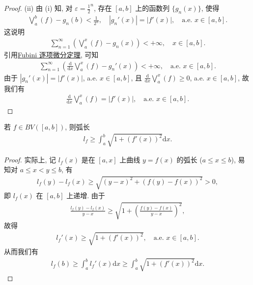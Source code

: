 \documentclass[../../main.tex]{subfiles}%
\begin{document}
\begin{proof}
(ii) 由 (i) 知, 对 $\varepsilon=\frac{1}{2}^n$, 存在 $[a,b]$ 上的函数列 $\{g_n(x)\}$, 使得
\begin{align*}
\bigvee_a^b(f) - g_n(b) < \frac{1}{2^n}, \quad |g_n'(x)| = |f'(x)|, \quad \text{a.e. } x\in[a,b].
\end{align*}
这说明
\begin{align*}
\sum_{n=1}^\infty \left(\bigvee_a^x(f) - g_n(x)\right) < +\infty, \quad x\in[a,b].
\end{align*}
引用\hyperref[theorem:实变函数--Fubini 逐项微分定理]{Fubini 逐项微分定理}, 可知
\begin{align*}
\sum_{n=1}^\infty \left(\frac{\mathrm{d}}{\mathrm{d}x}\bigvee_a^x(f) - g_n'(x)\right) < +\infty, \quad \text{a.e. } x\in[a,b].
\end{align*}
由于 $|g_n'(x)|=|f'(x)|$, a.e. $x\in[a,b]$, 且 $\frac{\mathrm{d}}{\mathrm{d}x}\bigvee_a^x(f)\geqslant 0$, a.e. $x\in[a,b]$, 故我们有
\begin{align*}
\frac{\mathrm{d}}{\mathrm{d}x}\bigvee_a^x(f) = |f'(x)|, \quad \text{a.e. } x\in[a,b].
\end{align*}

\end{proof}

\begin{proposition}\label{proposition:实变函数--弧长公式1}
若 $f\in BV([a,b])$, 则弧长
\begin{align*}
l_f \geqslant \int_a^b \sqrt{1+(f'(x))^2}\mathrm{d}x.
\end{align*}
\end{proposition}
\begin{proof}

实际上, 记 $l_f(x)$ 是在 $[a,x]$ 上曲线 $y=f(x)$ 的弧长 ($a\leqslant x\leqslant b$), 易知对 $a\leqslant x<y\leqslant b$, 有
\begin{align*}
l_f(y)-l_f(x) \geqslant \sqrt{(y-x)^2+(f(y)-f(x))^2} > 0,
\end{align*}
即 $l_f(x)$ 在 $[a,b]$ 上递增. 由于
\begin{align*}
\frac{l_f(y)-l_f(x)}{y-x} \geqslant \sqrt{1+\left(\frac{f(y)-f(x)}{y-x}\right)^2},
\end{align*}
故得
\begin{align*}
l_f'(x) \geqslant \sqrt{1+(f'(x))^2}, \quad \text{a.e. } x\in[a,b].
\end{align*}
从而我们有
\begin{align*}
l_f(b) \geqslant \int_a^b l_f'(x)\mathrm{d}x \geqslant \int_a^b \sqrt{1+(f'(x))^2}\mathrm{d}x.
\end{align*}

\end{proof}
\end{document}
